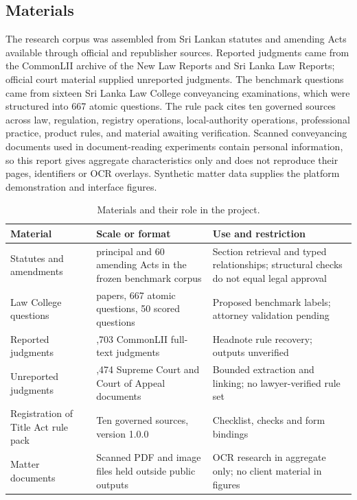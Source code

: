 \documentclass[12pt,a4paper]{article}
\begin{document}
\subsection{Materials}

The research corpus was assembled from Sri Lankan statutes and amending Acts available through official and republisher sources. Reported judgments came from the CommonLII archive of the New Law Reports and Sri Lanka Law Reports; official court material supplied unreported judgments. The benchmark questions came from sixteen Sri Lanka Law College conveyancing examinations, which were structured into 667 atomic questions. The rule pack cites ten governed sources across law, regulation, registry operations, local-authority operations, professional practice, product rules, and material awaiting verification. Scanned conveyancing documents used in document-reading experiments contain personal information, so this report gives aggregate characteristics only and does not reproduce their pages, identifiers or OCR overlays. Synthetic matter data supplies the platform demonstration and interface figures.


\begin{table}[H]
\centering
\caption{Materials and their role in the project.}
\fontsize{9.5}{11}\selectfont
\begin{tabularx}{\linewidth}{>{\RaggedRight\arraybackslash}X|>{\RaggedRight\arraybackslash}X|>{\RaggedRight\arraybackslash}X}
\toprule
\textbf{Material} & \textbf{Scale or format} & \textbf{Use and restriction} \\
\midrule
Statutes and amendments & 52 principal and 60 amending Acts in the frozen benchmark corpus & Section retrieval and typed relationships; structural checks do not equal legal approval \\
Law College questions & 16 papers, 667 atomic questions, 50 scored questions & Proposed benchmark labels; attorney validation pending \\
Reported judgments & 3,703 CommonLII full-text judgments & Headnote rule recovery; outputs unverified \\
Unreported judgments & 5,474 Supreme Court and Court of Appeal documents & Bounded extraction and linking; no lawyer-verified rule set \\
Registration of Title Act rule pack & Ten governed sources, version 1.0.0 & Checklist, checks and form bindings \\
Matter documents & Scanned PDF and image files held outside public outputs & OCR research in aggregate only; no client material in figures \\
\bottomrule
\end{tabularx}
\end{table}
\end{document}

